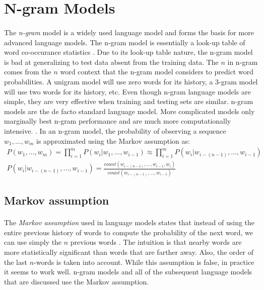 \section{N-gram Models}
\paragraph{}
The \emph{n-gram} model is a widely used language model and forms the basis for more advanced language models. The n-gram model is essentially a look-up table of word co-occurance statistics \cite{Jurafsky2009}. Due to its look-up table nature, the n-gram model is bad at generalizing to test data absent from the training data. The $n$ in n-gram comes from the $n$ word context that the n-gram model considers to predict word probabilities. A unigram model will use zero words for its history, a 3-gram model will use two words for its history, etc.  Even though n-gram language models are simple, they are very effective when training and testing sets are similar. n-gram models are the de facto standard language model. More complicated models only marginally best n-gram performance and are much more computationally intensive. \cite{Mikolov2012}. 
In an n-gram model, the probability of observing a sequence $w_1, \dots, w_m$ is approximated using the Markov assumption as:
\begin{align}
P(w_1,\dots,w_m) = \prod^{m}_{i=1} P(w_i|w_1,\dots, w_{i-1}) \approx  \prod^{m}_{i=1} P(w_i | w_{i-(n-1)},\dots, w_{i-1}) 
\\P(w_i | w_{i-(n-1)},\dots, w_{i-1}) = \frac{count(w_{i-(n-1)},\dots,w_{i-1},w_i)}{count(w_{i-(n-1)},\dots,w_{i-1})}
\end{align}
\subsection{Markov assumption}
\paragraph{}
The \emph{Markov assumption} used in language models states that instead of using the entire previous history of words to compute the probability of the next word, we can use simply the $n$ previous words \cite{Jurafsky2009}. The intuition is that nearby words are more statistically significant than words that are farther away. Also, the order of the last $n$-words is taken into account. While this assumption is false, in practice it seems to work well. n-gram models and all of the subsequent language models that are discussed use the Markov assumption.
